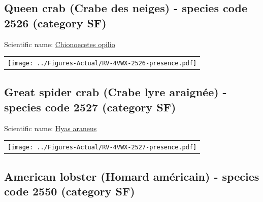 \documentclass[12pt]{article}\usepackage[]{graphicx}\usepackage[]{color}
\begin{document}
\hypertarget{sec:2526}{%
\subsection{Queen crab (Crabe des neiges) - species code 2526 (category SF)}\label{sec:2526}}

  


Scientific name: \href{http://www.marinespecies.org/aphia.php?p=taxdetails\&id=107315}{Chionoecetes opilio} \newline
\begin{minipage}{1.0\textwidth}
 \begin{tabular}{c}
\texttt{[image: ../Figures-Actual/RV-4VWX-2526-presence.pdf]} \\ 
\end{tabular} 
\end{minipage}
\clearpage

\renewcommand\thefigure{\thesubsection\Alph{figure}}

\setcounter{figure}{0}

\hypertarget{sec:2527}{%
\subsection{Great spider crab (Crabe lyre araignée) - species code 2527 (category SF)}\label{sec:2527}}

  


Scientific name: \href{http://www.marinespecies.org/aphia.php?p=taxdetails\&id=107322}{Hyas araneus} \newline
\begin{minipage}{1.0\textwidth}
 \begin{tabular}{c}
\texttt{[image: ../Figures-Actual/RV-4VWX-2527-presence.pdf]} \\ 
\end{tabular} 
\end{minipage}
\clearpage

\renewcommand\thefigure{\thesubsection\Alph{figure}}

\setcounter{figure}{0}

\hypertarget{sec:2550}{%
\subsection{American lobster (Homard américain) - species code 2550 (category SF)}\label{sec:2550}}
\end{document}
